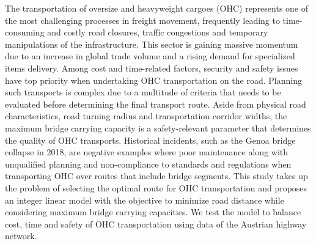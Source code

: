 
The transportation of oversize and heavyweight cargoes (OHC) represents one of the most challenging processes in freight movement, frequently leading to time-consuming and costly road closures, traffic congestions and temporary manipulations of the infrastructure. This sector is gaining massive momentum due to an increase in global trade volume and a rising demand for specialized items delivery. Among cost and time-related factors, security and safety issues have top priority when undertaking OHC transportation on the road. Planning such transports is complex due to a multitude of criteria that needs to be evaluated before determining the final transport route. Aside from physical road characteristics, road turning radius and transportation corridor widths, the maximum bridge carrying capacity is a safety-relevant parameter that determines the quality of OHC transports. Historical incidents, such as the Genoa bridge collapse in 2018, are negative examples where poor maintenance along with unqualified planning and non-compliance to standards and regulations when transporting OHC over routes that include bridge segments. This study takes up the problem of selecting the optimal route for OHC transportation and proposes an integer linear model with the objective to minimize road distance while considering maximum bridge carrying capacities. We test the model to balance cost, time and safety of OHC transportation using data of the Austrian highway network.
